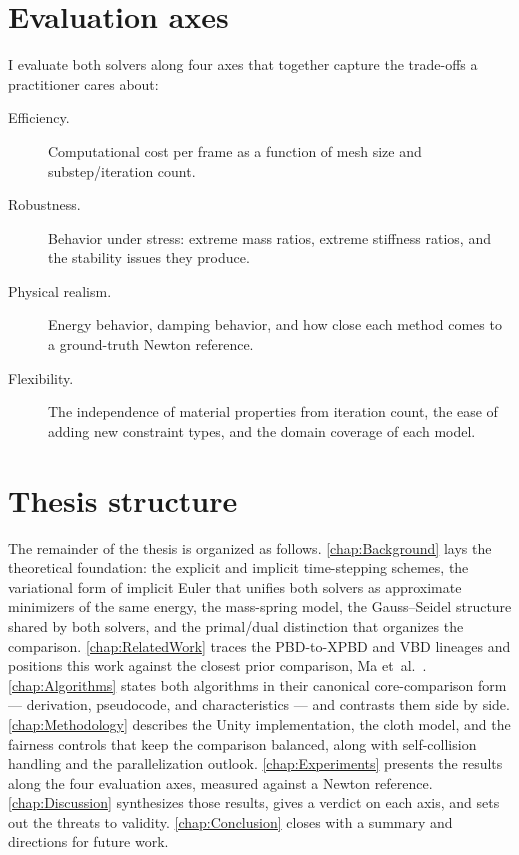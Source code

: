\section{Evaluation axes}
\label{sec:EvalAxes}
I evaluate both solvers along four axes that together capture the trade-offs a
practitioner cares about:
\begin{description}
    \item[Efficiency.] Computational cost per frame as a function of mesh size
        and substep/iteration count.
    \item[Robustness.] Behavior under stress: extreme mass ratios, extreme
        stiffness ratios, and the stability issues they produce.
    \item[Physical realism.] Energy behavior, damping behavior, and how close
        each method comes to a ground-truth Newton reference.
    \item[Flexibility.] The independence of material properties from iteration
        count, the ease of adding new constraint types, and the domain coverage
        of each model.
\end{description}

\section{Thesis structure}
\label{sec:Structure}
The remainder of the thesis is organized as follows.
\autoref{chap:Background} lays the theoretical foundation: the explicit and
implicit time-stepping schemes, the variational form of implicit Euler that
unifies both solvers as approximate minimizers of the same energy, the
mass-spring model, the Gauss--Seidel structure shared by both solvers, and the
primal/dual distinction that organizes the comparison.
\autoref{chap:RelatedWork} traces the PBD-to-XPBD and VBD lineages and positions
this work against the closest prior comparison, Ma et~al.~\cite{app142311072}.
\autoref{chap:Algorithms} states both algorithms in their canonical
core-comparison form --- derivation, pseudocode, and characteristics --- and
contrasts them side by side. \autoref{chap:Methodology} describes the Unity
implementation, the cloth model, and the fairness controls that keep the
comparison balanced, along with self-collision handling and the
parallelization outlook. \autoref{chap:Experiments} presents the results along
the four evaluation axes, measured against a Newton reference.
\autoref{chap:Discussion} synthesizes those results, gives a verdict on each
axis, and sets out the threats to validity. \autoref{chap:Conclusion} closes
with a summary and directions for future work.
